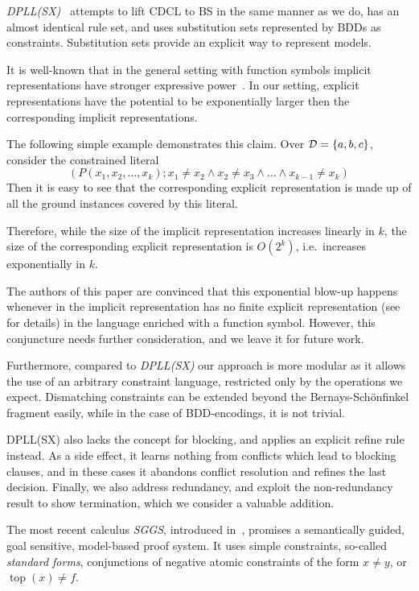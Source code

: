 \documentclass[a4paper]{article}
\newcommand{\mEPR}{Bernays-Sch\"onfinkel}
\newcommand{\mEPRs}{BS}
\newcommand{\ie}{i.e.\ }
\begin{document}
\emph{DPLL(SX)}~\cite{DPLLSX10} attempts to lift CDCL to {\mEPRs} in the same manner as we do, 
has an almost identical rule set, 
and uses substitution sets represented by BDDs as constraints. 
Substitution sets provide an explicit way to represent models. 

It is well-known that in the general setting with function symbols implicit representations have stronger expressive power~\cite{Pichler03}\cite{LassezM87}.
In our setting, explicit representations have the potential to be exponentially larger 
then the corresponding implicit representations.

The following simple example demonstrates this claim.
Over $\mathcal{D} = \{a,b,c\}$, consider the constrained literal
\[(P(x_1, x_2, \dots, x_k); x_1 \ne x_2 \land x_2 \ne x_3 \land \dots \land x_{k-1} \ne x_k)\]
Then it is easy to see that the corresponding explicit representation is made up of all the ground instances covered by this literal.

Therefore, while the size of the implicit representation increases linearly in $k$, the size of the corresponding explicit representation
is $O(2^k)$, \ie increases exponentially in $k$.

The authors of this paper are convinced that this exponential blow-up happens whenever in the implicit representation has 
no finite explicit representation (see \cite{Pichler03}\cite{LassezM87} for details) in the language enriched with a function symbol. 
However, this conjuncture needs further consideration, and we leave it for future work.

Furthermore, compared to \emph{DPLL(SX)} our approach is more modular 
as it allows the use of an arbitrary constraint language, restricted only by the operations we expect. 
Dismatching constraints can be extended beyond the {\mEPR} fragment easily, while in 
the case of BDD-encodings, it is not trivial.

DPLL(SX) also lacks the concept for blocking, and applies an explicit refine rule instead.
As a side effect, it learns nothing from conflicts which lead to blocking clauses, and 
in these cases it abandons conflict resolution and refines the last decision.
Finally, we also address redundancy, and exploit the non-redundancy result to show termination, which we consider a valuable addition.

The most recent calculus \emph{SGGS}, introduced in~\cite{SGGSExposition}, promises a semantically guided, goal sensitive, model-based proof system. 
It uses simple constraints, so-called \emph{standard forms}, conjunctions of negative atomic constraints 
of the form $x \ne y$, or $\operatorname{top}(x) \ne f$.
\end{document}
